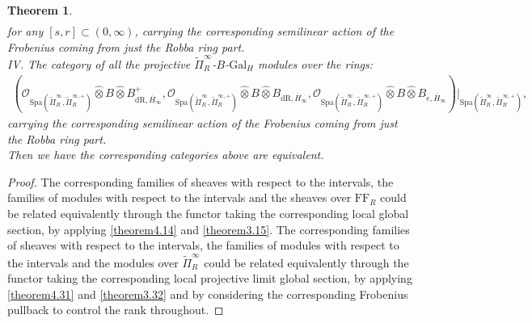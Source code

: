 \documentclass[12pt]{amsart}
\newtheorem{theorem}{Theorem}[section]
\theoremstyle{definition}
\numberwithin{equation}{section}
\begin{document}
\begin{theorem}
\begin{align}
\end{align}	
for any $[s,r]\subset (0,\infty)$, carrying the corresponding semilinear action of the Frobenius coming from just the Robba ring part.\\
IV. The category of all the projective $\widetilde{\Pi}_R^{\infty}$-$B$-$\mathrm{Gal}_H$ modules over the rings:
\begin{align}
(\mathcal{O}_{\mathrm{Spa}(\widetilde{\Pi}_R^{\infty},\widetilde{\Pi}_R^{\infty,+})}\widehat{\otimes}B\widehat{\otimes}B_{\mathrm{dR},\overline{H}_\infty}^+,\mathcal{O}_{\mathrm{Spa}(\widetilde{\Pi}_R^{\infty},\widetilde{\Pi}_R^{\infty,+})}\widehat{\otimes}B\widehat{\otimes}B_{\mathrm{dR},\overline{H}_\infty},\mathcal{O}_{\mathrm{Spa}(\widetilde{\Pi}_R^{\infty},\widetilde{\Pi}_R^{\infty,+})}\widehat{\otimes}B\widehat{\otimes}B_{e,\overline{H}_\infty})|_{\mathrm{Spa}(\widetilde{\Pi}_R^{\infty},\widetilde{\Pi}_R^{\infty,+})},
\end{align}	
carrying the corresponding semilinear action of the Frobenius coming from just the Robba ring part.\\
Then we have the corresponding categories above are equivalent.




\end{theorem}




\begin{proof}
The corresponding families of sheaves with respect to the intervals, the families of modules with respect to the intervals and the sheaves over $\mathrm{FF}_R$ could be related equivalently through the functor taking the corresponding local global section, by applying \cref{theorem4.14} and \cref{theorem3.15}. The corresponding families of sheaves with respect to the intervals, the families of modules with respect to the intervals and the modules over $\widetilde{\Pi}^\infty_R$ could be related equivalently through the functor taking the corresponding local projective limit global section, by applying \cref{theorem4.31} and \cref{theorem3.32} and by considering the corresponding Frobenius pullback to control the rank throughout. 	
\end{proof}
\end{document}
